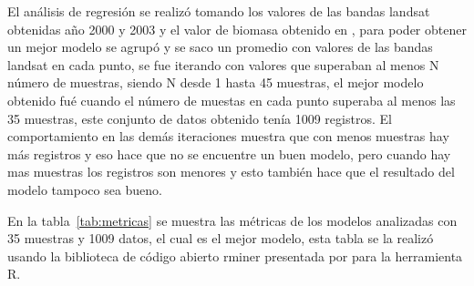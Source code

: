 El análisis de regresión se realizó tomando los valores de las bandas landsat obtenidas año 2000 y 2003 y el valor de biomasa obtenido en \cite{baccini2008afirst},
para poder obtener un mejor modelo se agrupó y se saco un promedio con valores de las bandas landsat en cada punto, se fue iterando con  valores que superaban al menos N número de
muestras, siendo N desde 1 hasta 45 muestras, el mejor modelo obtenido fué cuando el número de muestas en cada punto superaba al menos las 35 muestras, este conjunto
de datos obtenido tenía 1009 registros. El comportamiento en las demás iteraciones muestra que con menos muestras hay más registros y eso hace que no se encuentre un buen modelo,
pero cuando hay mas muestras los registros son menores y esto también hace que el resultado del modelo tampoco sea bueno.

En la tabla~\ref{tab:metricas} se muestra las métricas de los modelos analizadas con 35 muestras y 1009 datos, el cual es el mejor modelo, esta tabla 
se la realizó usando la biblioteca de código abierto rminer presentada por \cite{cortez2010data} para la herramienta R.

\begin{table}
\caption{Métricas de modelos analizados con 35 muestras y 1009 datos}
\label{tab:metricas}
\centering
{}
\end{table}

